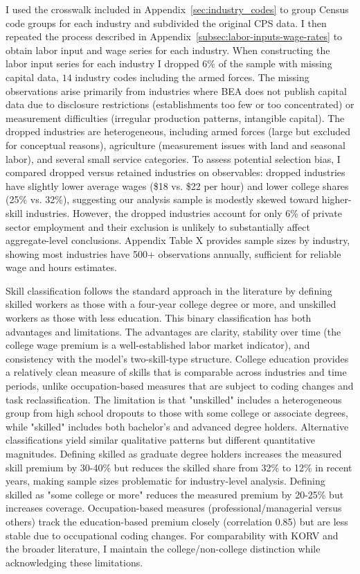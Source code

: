 \documentclass[12pt]{article}
\begin{document}
I used the crosswalk included in Appendix~\ref{sec:industry_codes} to group Census code groups for each industry and subdivided the original CPS data. I then repeated the process described in Appendix~\ref{subsec:labor-inputs-wage-rates} to obtain labor input and wage series for each industry. When constructing the labor input series for each industry I dropped $6\%$ of the sample with missing capital data, $14$ industry codes including the armed forces. The missing observations arise primarily from industries where BEA does not publish capital data due to disclosure restrictions (establishments too few or too concentrated) or measurement difficulties (irregular production patterns, intangible capital). The dropped industries are heterogeneous, including armed forces (large but excluded for conceptual reasons), agriculture (measurement issues with land and seasonal labor), and several small service categories. To assess potential selection bias, I compared dropped versus retained industries on observables: dropped industries have slightly lower average wages (\$18 vs. \$22 per hour) and lower college shares (25\% vs. 32\%), suggesting our analysis sample is modestly skewed toward higher-skill industries. However, the dropped industries account for only 6\% of private sector employment and their exclusion is unlikely to substantially affect aggregate-level conclusions. Appendix Table X provides sample sizes by industry, showing most industries have 500+ observations annually, sufficient for reliable wage and hours estimates.

Skill classification follows the standard approach in the literature by defining skilled workers as those with a four-year college degree or more, and unskilled workers as those with less education. This binary classification has both advantages and limitations. The advantages are clarity, stability over time (the college wage premium is a well-established labor market indicator), and consistency with the model's two-skill-type structure. College education provides a relatively clean measure of skills that is comparable across industries and time periods, unlike occupation-based measures that are subject to coding changes and task reclassification. The limitation is that "unskilled" includes a heterogeneous group from high school dropouts to those with some college or associate degrees, while "skilled" includes both bachelor's and advanced degree holders. Alternative classifications yield similar qualitative patterns but different quantitative magnitudes. Defining skilled as graduate degree holders increases the measured skill premium by 30-40\% but reduces the skilled share from 32\% to 12\% in recent years, making sample sizes problematic for industry-level analysis. Defining skilled as "some college or more" reduces the measured premium by 20-25\% but increases coverage. Occupation-based measures (professional/managerial versus others) track the education-based premium closely (correlation 0.85) but are less stable due to occupational coding changes. For comparability with KORV and the broader literature, I maintain the college/non-college distinction while acknowledging these limitations.
\end{document}

